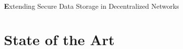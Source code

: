 \label{cha:outline}

{\Huge  \textbf Extending Secure Data Storage in Decentralized Networks}\\
\section{State of the Art}

